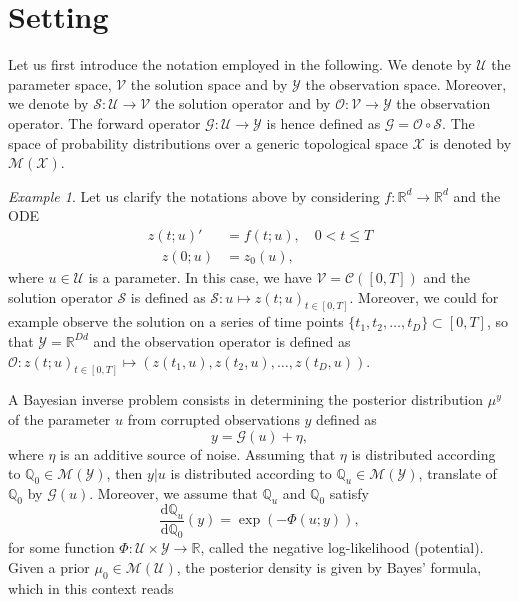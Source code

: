 \documentclass{article}
\title{{\TheTitle}}
\author{Giacomo Garegnani}
\date{}
\theoremstyle{remark}
\newtheorem{example}{Example}
\theoremstyle{definition}
\newcommand{\R}{\mathbb{R}}
\newcommand{\dd}{\mathrm{d}}
\newcommand{\ml}{\mathcal}
\begin{document}
\maketitle

\section*{Setting} Let us first introduce the notation employed in the following. We denote by $\ml U$ the parameter space, $\ml V$ the solution space and by $\ml Y$ the observation space. Moreover, we denote by $\ml S \colon \ml U \to \ml V$ the solution operator and by $\ml O \colon \ml V \to \ml Y$ the observation operator. The forward operator $\ml G \colon \ml U \to \ml Y$ is hence defined as $\ml G = \ml O \circ \ml S$. The space of probability distributions over a generic topological space $\ml X$ is denoted by $\ml M(\ml X)$.
\begin{example} Let us clarify the notations above by considering $f\colon \R^d \to \R^d$ and the ODE
	\begin{align*}
		z(t; u)'& = f(t; u), \quad 0 < t \leq T \\
		\quad z(0; u) &= z_0(u),
	\end{align*}
	where $u \in \ml U$ is a parameter. In this case, we have $\ml V = \ml C([0, T])$ and the solution operator $\ml S$ is defined as $\ml S \colon u \mapsto z(t; u)_{t\in[0, T]}$. Moreover, we could for example observe the solution on a series of time points $\{t_1, t_2, \ldots, t_D\} \subset [0, T]$, so that $\ml Y = \R^{Dd}$ and the observation operator is defined as $\ml O \colon z(t; u)_{t\in[0, T]} \mapsto (z(t_1, u), z(t_2, u), \ldots, z(t_D, u))$.
\end{example}
A Bayesian inverse problem consists in determining the posterior distribution $\mu^y$ of the parameter $u$ from corrupted observations $y$ defined as
\begin{equation*}
	y = \ml G(u) + \eta,
\end{equation*}
where $\eta$ is an additive source of noise. Assuming that $\eta$ is distributed according to $\mathbb Q_0 \in \ml M(\ml Y)$, then $y|u$ is distributed according to $\mathbb Q_u \in \ml M(\ml Y)$, translate of $\mathbb Q_0$ by $\ml G(u)$. Moreover, we assume that $\mathbb Q_u$ and $\mathbb Q_0$ satisfy
\begin{equation*}
	\frac{\dd \mathbb Q_u }{\dd \mathbb Q_0} (y) = \exp (-\Phi(u; y)),
\end{equation*}
for some function $\Phi\colon \ml U\times \ml Y \to \R$, called the negative log-likelihood (potential). Given a prior $\mu_0 \in \ml M(\ml U)$, the posterior density is given by Bayes' formula, which in this context reads
\end{document}
